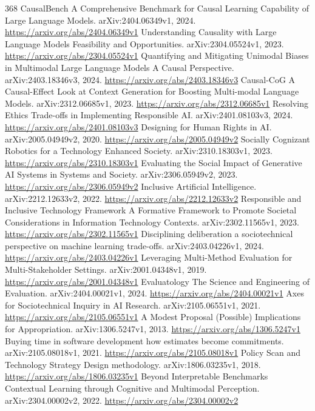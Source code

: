 \documentclass[11pt]{article}
\begin{document}
\begin{thebibliography}{368}
 CausalBench A Comprehensive Benchmark for Causal Learning Capability of Large Language Models. arXiv:2404.06349v1, 2024. \url{https://arxiv.org/abs/2404.06349v1}
 Understanding Causality with Large Language Models Feasibility and Opportunities. arXiv:2304.05524v1, 2023. \url{https://arxiv.org/abs/2304.05524v1}
 Quantifying and Mitigating Unimodal Biases in Multimodal Large Language Models A Causal Perspective. arXiv:2403.18346v3, 2024. \url{https://arxiv.org/abs/2403.18346v3}
 Causal-CoG A Causal-Effect Look at Context Generation for Boosting Multi-modal Language Models. arXiv:2312.06685v1, 2023. \url{https://arxiv.org/abs/2312.06685v1}
 Resolving Ethics Trade-offs in Implementing Responsible AI. arXiv:2401.08103v3, 2024. \url{https://arxiv.org/abs/2401.08103v3}
 Designing for Human Rights in AI. arXiv:2005.04949v2, 2020. \url{https://arxiv.org/abs/2005.04949v2}
 Socially Cognizant Robotics for a Technology Enhanced Society. arXiv:2310.18303v1, 2023. \url{https://arxiv.org/abs/2310.18303v1}
 Evaluating the Social Impact of Generative AI Systems in Systems and Society. arXiv:2306.05949v2, 2023. \url{https://arxiv.org/abs/2306.05949v2}
 Inclusive Artificial Intelligence. arXiv:2212.12633v2, 2022. \url{https://arxiv.org/abs/2212.12633v2}
 Responsible and Inclusive Technology Framework A Formative Framework to Promote Societal Considerations in Information Technology Contexts. arXiv:2302.11565v1, 2023. \url{https://arxiv.org/abs/2302.11565v1}
 Disciplining deliberation a sociotechnical perspective on machine learning trade-offs. arXiv:2403.04226v1, 2024. \url{https://arxiv.org/abs/2403.04226v1}
 Leveraging Multi-Method Evaluation for Multi-Stakeholder Settings. arXiv:2001.04348v1, 2019. \url{https://arxiv.org/abs/2001.04348v1}
 Evaluatology The Science and Engineering of Evaluation. arXiv:2404.00021v1, 2024. \url{https://arxiv.org/abs/2404.00021v1}
 Axes for Sociotechnical Inquiry in AI Research. arXiv:2105.06551v1, 2021. \url{https://arxiv.org/abs/2105.06551v1}
 A Modest Proposal (Possible) Implications for Appropriation. arXiv:1306.5247v1, 2013. \url{https://arxiv.org/abs/1306.5247v1}
 Buying time in software development how estimates become commitments. arXiv:2105.08018v1, 2021. \url{https://arxiv.org/abs/2105.08018v1}
 Policy Scan and Technology Strategy Design methodology. arXiv:1806.03235v1, 2018. \url{https://arxiv.org/abs/1806.03235v1}
 Beyond Interpretable Benchmarks Contextual Learning through Cognitive and Multimodal Perception. arXiv:2304.00002v2, 2022. \url{https://arxiv.org/abs/2304.00002v2}
\end{thebibliography}
\end{document}
